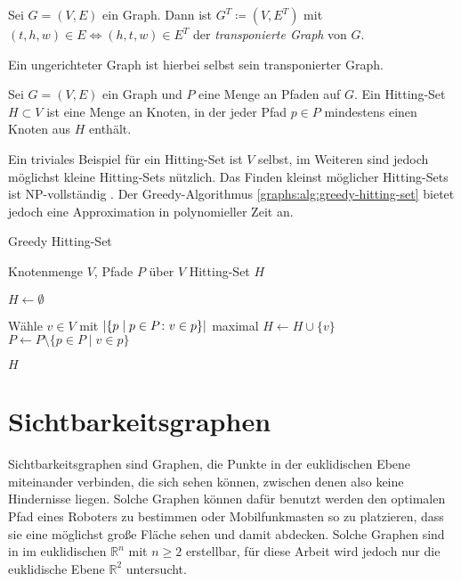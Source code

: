 \begin{definition}
    Sei $G = (V, E)$ ein Graph. Dann ist $G^T \coloneq (V, E^T)$ mit $(t, h, w) \in E \Leftrightarrow (h, t, w) \in E^T$ der \emph{transponierte Graph} von $G$.
\end{definition}

Ein ungerichteter Graph ist hierbei selbst sein transponierter Graph.

\begin{definition}
    Sei $G = (V, E)$ ein Graph und $P$ eine Menge an Pfaden auf $G$.
    Ein Hitting-Set $H \subset V$ ist eine Menge an Knoten, in der jeder Pfad $p \in P$ mindestens einen Knoten aus $H$ enthält.
\end{definition}

Ein triviales Beispiel für ein Hitting-Set ist $V$ selbst, im Weiteren sind jedoch möglichst kleine Hitting-Sets nützlich.
Das Finden kleinst möglicher Hitting-Sets ist NP-vollständig \cite{Kar72}.
Der Greedy-Algorithmus \ref{graphs:alg:greedy-hitting-set} bietet jedoch eine Approximation in polynomieller Zeit an.

\begin{algorithm}
    \caption{Greedy Hitting-Set}
    \begin{algorithmic}[1]
        \Require Knotenmenge $V$, Pfade $P$ über $V$
        \Ensure Hitting-Set $H$

        \State $H \gets \emptyset$

        \State

        \State Wähle $v \in V$ mit $\abs{ \{ p \mid p \in P \colon v \in p \}}$ maximal
        \State $H \gets H \cup \{  v \}$
        \State $P \gets P \setminus \{p \in P \mid v \in p\}$
        \EndWhile

        \State

        \State \Return $H$
    \end{algorithmic}
    \label{graphs:alg:greedy-hitting-set}
\end{algorithm}


\section{Sichtbarkeitsgraphen}

Sichtbarkeitsgraphen sind Graphen, die Punkte in der euklidischen Ebene miteinander verbinden, die sich sehen können, zwischen denen also keine Hindernisse liegen.
Solche Graphen können dafür benutzt werden den optimalen Pfad eines Roboters zu bestimmen oder Mobilfunkmasten so zu platzieren, dass sie eine möglichst große Fläche sehen und damit abdecken.
Solche Graphen sind in im euklidischen $\mathbb{R}^n$ mit $n \geq 2$ erstellbar, für diese Arbeit wird jedoch nur die euklidische Ebene $\mathbb{R}^2$ untersucht.

